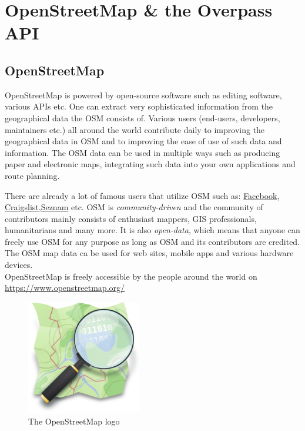 \section{OpenStreetMap \& the Overpass API}
\subsection{OpenStreetMap}
OpenStreetMap is powered by open-source software such as editing software, various APIs etc.
One can extract very sophisticated information from the geographical data the OSM consists of.
Various users (end-users, developers, maintainers etc.) all around the world contribute daily to improving the geographical
data in OSM and to improving the ease of use of such data and information.
The OSM data can be used in multiple ways such as producing paper and electronic maps,
integrating such data into your own applications and route planning.\\
\newline

There are already a lot of famous users that utilize OSM such as:
\href{https://www.facebook.com/}{Facebook},
\href{https://www.craigslist.org/}{Craigslist},\href{https://www.seznam.cz/}{Seznam} etc.
OSM is \textit{community-driven} and the community of contributors mainly consists of enthusiast mappers,
GIS professionals, humanitarians and many more. It is also \textit{open-data}, which means that anyone can freely use
OSM for any purpose as long as OSM and its contributors are credited.
The OSM map data ca be used for web sites, mobile apps and various hardware devices.\\
\newline
OpenStreetMap is freely accessible by the people around the world on \href{https://www.openstreetmap.org/}{https://www.openstreetmap.org/}\\
\newline
\begin{figure}[H]
    \centering
    \includegraphics[width=5cm]{./Figures/Introduction/openstreetmap_logo.png}
    \caption{The OpenStreetMap logo}
\end{figure}
\newpage
